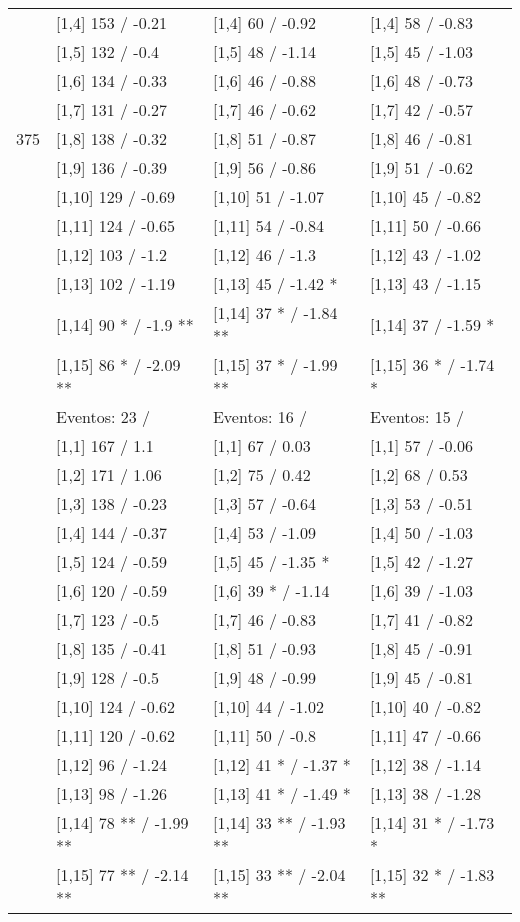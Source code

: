 \begin{table}
\begin{tabular}[t]{llll}
\addlinespace
 & {}[1,4] 153  / -0.21 & {}[1,4] 60  / -0.92 & {}[1,4] 58  / -0.83\\
 & {}[1,5] 132  / -0.4 & {}[1,5] 48  / -1.14 & {}[1,5] 45  / -1.03\\
 & {}[1,6] 134  / -0.33 & {}[1,6] 46  / -0.88 & {}[1,6] 48  / -0.73\\
 & {}[1,7] 131  / -0.27 & {}[1,7] 46  / -0.62 & {}[1,7] 42  / -0.57\\
375 & {}[1,8] 138  / -0.32 & {}[1,8] 51  / -0.87 & {}[1,8] 46  / -0.81\\
\addlinespace
 & {}[1,9] 136  / -0.39 & {}[1,9] 56  / -0.86 & {}[1,9] 51  / -0.62\\
 & {}[1,10] 129  / -0.69 & {}[1,10] 51  / -1.07 & {}[1,10] 45  / -0.82\\
 & {}[1,11] 124  / -0.65 & {}[1,11] 54  / -0.84 & {}[1,11] 50  / -0.66\\
 & {}[1,12] 103  / -1.2 & {}[1,12] 46  / -1.3 & {}[1,12] 43  / -1.02\\
 & {}[1,13] 102  / -1.19 & {}[1,13] 45  / -1.42 * & {}[1,13] 43  / -1.15\\
\addlinespace
 & {}[1,14] 90 * / -1.9 ** & {}[1,14] 37 * / -1.84 ** & {}[1,14] 37  / -1.59 *\\
 & {}[1,15] 86 * / -2.09 ** & {}[1,15] 37 * / -1.99 ** & {}[1,15] 36 * / -1.74 *\\
 & Eventos:  23 / & Eventos:  16 / & Eventos:  15 /\\
 & {}[1,1] 167  / 1.1 & {}[1,1] 67  / 0.03 & {}[1,1] 57  / -0.06\\
 & {}[1,2] 171  / 1.06 & {}[1,2] 75  / 0.42 & {}[1,2] 68  / 0.53\\
\addlinespace
 & {}[1,3] 138  / -0.23 & {}[1,3] 57  / -0.64 & {}[1,3] 53  / -0.51\\
 & {}[1,4] 144  / -0.37 & {}[1,4] 53  / -1.09 & {}[1,4] 50  / -1.03\\
 & {}[1,5] 124  / -0.59 & {}[1,5] 45  / -1.35 * & {}[1,5] 42  / -1.27\\
 & {}[1,6] 120  / -0.59 & {}[1,6] 39 * / -1.14 & {}[1,6] 39  / -1.03\\
 & {}[1,7] 123  / -0.5 & {}[1,7] 46  / -0.83 & {}[1,7] 41  / -0.82\\
\addlinespace
500 & {}[1,8] 135  / -0.41 & {}[1,8] 51  / -0.93 & {}[1,8] 45  / -0.91\\
 & {}[1,9] 128  / -0.5 & {}[1,9] 48  / -0.99 & {}[1,9] 45  / -0.81\\
 & {}[1,10] 124  / -0.62 & {}[1,10] 44  / -1.02 & {}[1,10] 40  / -0.82\\
 & {}[1,11] 120  / -0.62 & {}[1,11] 50  / -0.8 & {}[1,11] 47  / -0.66\\
 & {}[1,12] 96  / -1.24 & {}[1,12] 41 * / -1.37 * & {}[1,12] 38  / -1.14\\
\addlinespace
 & {}[1,13] 98  / -1.26 & {}[1,13] 41 * / -1.49 * & {}[1,13] 38  / -1.28\\
 & {}[1,14] 78 ** / -1.99 ** & {}[1,14] 33 ** / -1.93 ** & {}[1,14] 31 * / -1.73 *\\
 & {}[1,15] 77 ** / -2.14 ** & {}[1,15] 33 ** / -2.04 ** & {}[1,15] 32 * / -1.83 **\\
\bottomrule
\end{tabular}
\end{table}
